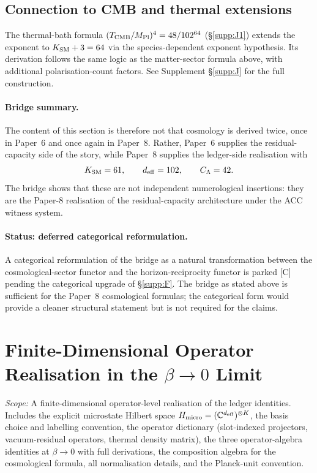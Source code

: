 \documentclass[11pt]{article}
\theoremstyle{plain}
\theoremstyle{definition}
\theoremstyle{remark}
\newcommand{\Mpl}{M_{\rm Pl}}
\begin{document}
\subsection{Connection to CMB and thermal extensions}\label{supp:G3}

The thermal-bath formula $(T_{\rm CMB}/\Mpl)^4 = 48/102^{64}$ (\S\ref{supp:J1}) extends the exponent to $K_{\rm SM} + 3 = 64$ via the species-dependent exponent hypothesis.  Its derivation follows the same logic as the matter-sector formula above, with additional polarisation-count factors.  See Supplement \S\ref{supp:J} for the full construction.

\paragraph{Bridge summary.}
The content of this section is therefore not that cosmology is derived twice, once in Paper~6 and once again in Paper~8.  Rather, Paper~6 supplies the residual-capacity side of the story, while Paper~8 supplies the ledger-side realisation with
\[
  K_{\rm SM} = 61,\qquad d_{\rm eff} = 102,\qquad C_\Lambda = 42.
\]
The bridge shows that these are not independent numerological insertions: they are the Paper-8 realisation of the residual-capacity architecture under the ACC witness system.

\paragraph{Status: deferred categorical reformulation.}  A categorical reformulation of the bridge as a natural transformation between the cosmological-sector functor and the horizon-reciprocity functor is parked [C] pending the categorical upgrade of \S\ref{supp:F}.  The bridge as stated above is sufficient for the Paper~8 cosmological formulas; the categorical form would provide a cleaner structural statement but is not required for the claims.

\section{Finite-Dimensional Operator Realisation in the $\beta \to 0$ Limit}\label{supp:H}

\noindent\textit{Scope:} A finite-dimensional operator-level realisation of the ledger identities.  Includes the explicit microstate Hilbert space $H_{\rm micro} = (\mathbb{C}^{d_{\rm eff}})^{\otimes K}$, the basis choice and labelling convention, the operator dictionary (slot-indexed projectors, vacuum-residual operators, thermal density matrix), the three operator-algebra identities at $\beta \to 0$ with full derivations, the composition algebra for the cosmological formula, all normalisation details, and the Planck-unit convention.
\end{document}
